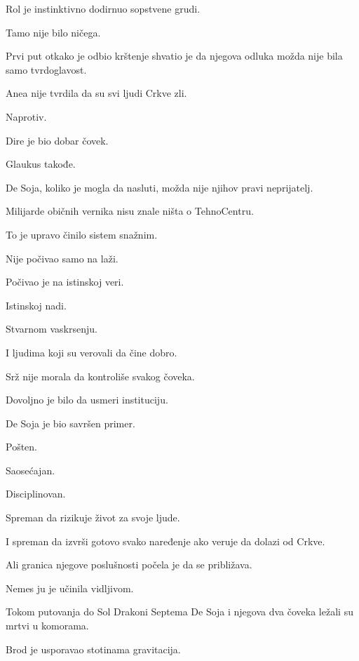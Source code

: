 \bigskip

Rol je instinktivno dodirnuo sopstvene grudi.

Tamo nije bilo ničega.

Prvi put otkako je odbio krštenje shvatio je da njegova odluka možda nije bila samo tvrdoglavost.

\bigskip

Anea nije tvrdila da su svi ljudi Crkve zli.

Naprotiv.

Dire je bio dobar čovek.

Glaukus takođe.

De Soja, koliko je mogla da nasluti, možda nije njihov pravi neprijatelj.

Milijarde običnih vernika nisu znale ništa o TehnoCentru.

\bigskip

To je upravo činilo sistem snažnim.

Nije počivao samo na laži.

Počivao je na istinskoj veri.

Istinskoj nadi.

Stvarnom vaskrsenju.

I ljudima koji su verovali da čine dobro.

\bigskip

Srž nije morala da kontroliše svakog čoveka.

Dovoljno je bilo da usmeri instituciju.

\bigskip

De Soja je bio savršen primer.

Pošten.

Saosećajan.

Disciplinovan.

Spreman da rizikuje život za svoje ljude.

\bigskip

I spreman da izvrši gotovo svako naređenje ako veruje da dolazi od Crkve.

\bigskip

Ali granica njegove poslušnosti počela je da se približava.

\bigskip

Nemes ju je učinila vidljivom.

\bigskip

Tokom putovanja do Sol Drakoni Septema De Soja i njegova dva čoveka ležali su mrtvi u komorama.

Brod je usporavao stotinama gravitacija.


